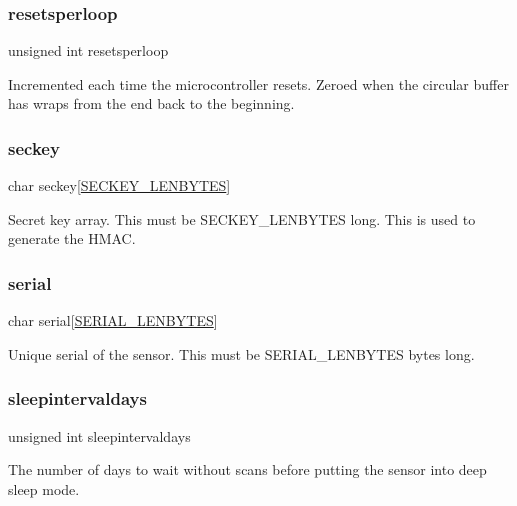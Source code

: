 \subsubsection{\texorpdfstring{resetsperloop}{resetsperloop}}
{\footnotesize\ttfamily unsigned int resetsperloop}

Incremented each time the microcontroller resets. Zeroed when the circular buffer has wraps from the end back to the beginning. \mbox{\label{structnvstruct_a680c038327bbd20d30beade8d0ef1dd4}} 
\subsubsection{\texorpdfstring{seckey}{seckey}}
{\footnotesize\ttfamily char seckey\mbox{[}\mbox{\hyperlink{nvtype_8h_ae32c9007f59a1d55426d7fd63e10d589}{S\+E\+C\+K\+E\+Y\+\_\+\+L\+E\+N\+B\+Y\+T\+ES}}\mbox{]}}

Secret key array. This must be S\+E\+C\+K\+E\+Y\+\_\+\+L\+E\+N\+B\+Y\+T\+ES long. This is used to generate the H\+M\+AC. \mbox{\label{structnvstruct_a8c4928cc85c5336514401eb142ea7d50}} 
\subsubsection{\texorpdfstring{serial}{serial}}
{\footnotesize\ttfamily char serial\mbox{[}\mbox{\hyperlink{nvtype_8h_a09589b0f4cf4e32679b6dc064903edef}{S\+E\+R\+I\+A\+L\+\_\+\+L\+E\+N\+B\+Y\+T\+ES}}\mbox{]}}

Unique serial of the sensor. This must be S\+E\+R\+I\+A\+L\+\_\+\+L\+E\+N\+B\+Y\+T\+ES bytes long. \mbox{\label{structnvstruct_a7535c524cca52dcf1e60b1e6762fea4c}} 
\subsubsection{\texorpdfstring{sleepintervaldays}{sleepintervaldays}}
{\footnotesize\ttfamily unsigned int sleepintervaldays}

The number of days to wait without scans before putting the sensor into deep sleep mode. \mbox{\label{structnvstruct_a34de27bbd20aa5f15e4e4482ce5a0309}} 
